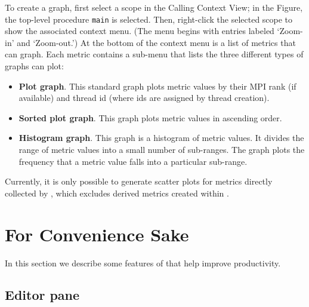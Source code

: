 To create a graph, first select a scope in the Calling Context View; in the Figure, the top-level procedure \texttt{main} is selected.
Then, right-click the selected scope to show the associated context menu.
(The menu begins with entries labeled `Zoom-in' and `Zoom-out.')
At the bottom of the context menu is a list of metrics that \hpcviewer{} can graph.
Each metric contains a sub-menu that lists the three different types of graphs \hpcviewer{} can plot:
\begin{itemize}
\item \textbf{Plot graph}.
  This standard graph plots metric values by their MPI rank (if available) and thread id (where ids are assigned by thread creation).

\item \textbf{Sorted plot graph}.
  This graph plots metric values in ascending order.

\item \textbf{Histogram graph}.
  This graph is a histogram of metric values.
  It divides the range of metric values into a small number of sub-ranges.
  The graph plots the frequency that a metric value falls into a particular sub-range.
\end{itemize}

Currently, it is only possible to generate scatter plots for metrics directly collected by \hpcrun{}, which excludes derived metrics created within \hpcviewer{}.




\section{For Convenience Sake}

In this section we describe some features of \hpcviewer{} that help improve productivity.


\subsection{Editor pane}

